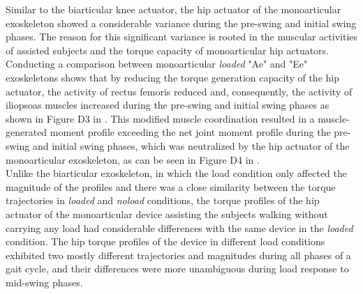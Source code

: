 \documentclass[10pt,letterpaper]{article}
\begin{document}
Similar to the biarticular knee actuator, the hip actuator of the monoarticular exoskeleton showed a considerable variance during the pre-swing and initial swing phases. The reason for this significant variance is rooted in the muscular activities of assisted subjects and the torque capacity of monoarticular hip actuators. Conducting a comparison between monoarticular {\it loaded} "Ae" and "Ee" exoskeletons shows that by reducing the torque generation capacity of the hip actuator, the activity of rectus femoris reduced and, consequently, the activity of iliopsoas muscles increased during the pre-swing and initial swing phases as shown in Figure D3 in . This modified muscle coordination resulted in a muscle-generated moment profile exceeding the net joint moment profile during the pre-swing and initial swing phases, which was neutralized by the hip actuator of the monoarticular exoskeleton, as can be seen in Figure D4 in .\\
Unlike the biarticular exoskeleton, in which the load condition only affected the magnitude of the profiles and there was a close similarity between the torque trajectories in \textit{loaded} and \textit{noload} conditions, the torque profiles of the hip actuator of the monoarticular device assisting the subjects walking without carrying any load had considerable differences with the same device in the \textit{loaded} condition. The hip torque profiles of the device in different load conditions exhibited two mostly different trajectories and magnitudes during all phases of a gait cycle, and their differences were more unambiguous during load response to mid-swing phases.\\
\end{document}

